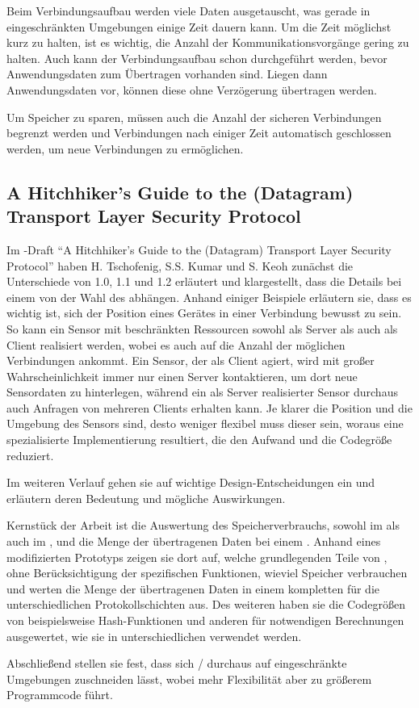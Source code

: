 Beim Verbindungsaufbau werden viele Daten ausgetauscht, was gerade in eingeschränkten Umgebungen einige Zeit dauern kann. Um die Zeit
möglichst kurz zu halten, ist es wichtig, die Anzahl der Kommunikationsvorgänge gering zu halten. Auch kann der Verbindungsaufbau schon
durchgeführt werden, bevor Anwendungsdaten zum Übertragen vorhanden sind. Liegen dann Anwendungsdaten vor, können diese ohne Verzögerung
übertragen werden.

Um Speicher zu sparen, müssen auch die Anzahl der sicheren Verbindungen begrenzt werden und Verbindungen nach einiger Zeit
automatisch geschlossen werden, um neue Verbindungen zu ermöglichen.

\subsection{A Hitchhiker's Guide to the (Datagram) Transport Layer Security Protocol}
Im -Draft "`A Hitchhiker's Guide to the (Datagram) Transport Layer Security Protocol"' \cite{draftmintls} haben H. Tschofenig, S.S. Kumar
und S. Keoh zunächst die Unterschiede von  1.0, 1.1 und 1.2 erläutert und klargestellt, dass die Details bei einem  von der Wahl des
 abhängen. Anhand einiger Beispiele erläutern sie, dass es wichtig ist, sich der Position eines Gerätes in einer Verbindung bewusst zu sein.
So kann ein Sensor mit beschränkten Ressourcen sowohl als Server als auch als Client realisiert werden, wobei es auch auf die Anzahl der möglichen
Verbindungen ankommt. Ein Sensor, der als Client agiert, wird mit großer Wahrscheinlichkeit immer nur einen Server kontaktieren, um dort neue Sensordaten
zu hinterlegen, während ein als Server realisierter Sensor durchaus auch Anfragen von mehreren Clients erhalten kann. Je klarer die Position und die
Umgebung des Sensors sind, desto weniger flexibel muss dieser sein, woraus eine spezialisierte Implementierung resultiert, die den Aufwand und die Codegröße reduziert.

Im weiteren Verlauf gehen sie auf wichtige Design-Entscheidungen ein und erläutern deren Bedeutung und mögliche Auswirkungen.

Kernstück der Arbeit ist die Auswertung des Speicherverbrauchs, sowohl im  als auch im , und die Menge der übertragenen Daten bei einem .
Anhand eines modifizierten Prototyps zeigen sie dort auf, welche grundlegenden Teile von , ohne Berücksichtigung der  spezifischen Funktionen,
wieviel Speicher verbrauchen und werten die Menge der übertragenen Daten in einem kompletten  für die unterschiedlichen Protokollschichten aus.
Des weiteren haben sie die Codegrößen von beispielsweise Hash-Funktionen und anderen für  notwendigen Berechnungen ausgewertet, wie sie in unterschiedlichen
 verwendet werden.

Abschließend stellen sie fest, dass sich / durchaus auf eingeschränkte Umgebungen zuschneiden lässt, wobei mehr Flexibilität aber zu
größerem Programmcode führt. 

